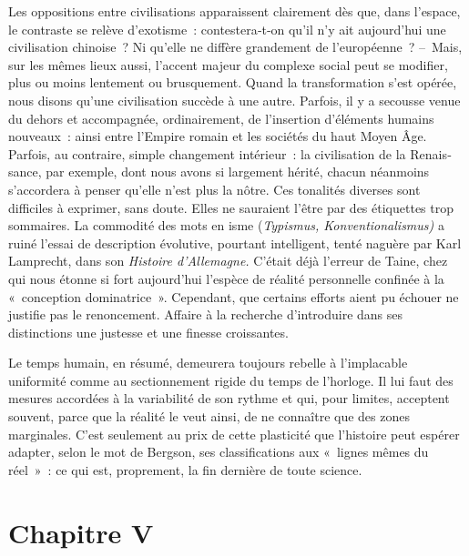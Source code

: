 \documentclass[french,twoside]{book} %
\newcommand{\astermono}{\medskip\centerline{\color{rubric}\large\selectfont{\syms ✻}}\medskip\par}%
\begin{document}
Les oppositions entre civilisations apparaissent clairement dès que, dans l’espace, le contraste se relève d’exotisme : contestera‑t‑on qu’il n’y ait aujourd’hui une civilisation chinoise ? Ni qu’elle ne diffère grandement de l’européenne ? – Mais, sur les mêmes lieux aussi, l’accent majeur du complexe social peut se modifier, plus ou moins lentement ou brusquement. Quand la transformation s’est opérée, nous disons qu’une civilisation succède à une autre. Parfois, il y a secousse venue du dehors et accom­pagnée, ordinairement, de l’insertion d’éléments humains nouveaux : ainsi entre l’Empire romain et les sociétés du haut Moyen Âge. Parfois, au contraire, simple changement intérieur : la civilisation de la Renais­sance, par exemple, dont nous avons si largement hérité, chacun néanmoins s’accordera à penser qu’elle n’est plus la nôtre. Ces tonalités diverses sont difficiles à exprimer, sans doute. Elles ne sauraient l’être par des étiquettes trop sommaires. La commodité des mots en isme (\emph{Typismus, Konven­tionalismus)} a ruiné l’essai de description évolutive, pourtant intelligent, tenté naguère par Karl Lamprecht, dans son \emph{Histoire d’Allemagne.} C’était déjà l’erreur de Taine, chez qui nous étonne si fort aujourd’hui l’espèce de réalité personnelle confinée à la « conception dominatrice ». Cependant, que certains efforts aient pu échouer ne justifie pas le renoncement. Affaire à la recherche d’introduire dans ses distinctions une justesse et une finesse croissantes.\par

\astermono

\noindent Le temps humain, en résumé, demeurera toujours rebelle à l’implacable uniformité comme au sectionnement rigide du temps de l’horloge. Il lui faut des mesures accordées à la variabilité de son rythme et qui, pour limites, acceptent souvent, parce que la réalité le veut ainsi, de ne con­naître que des zones marginales. C’est seulement au prix de cette plasticité que l’histoire peut espérer adapter, selon le mot de Bergson, ses classi­fications aux « lignes mêmes du réel » : ce qui est, proprement, la fin dernière de toute science.
\section[{Chapitre V}]{Chapitre V}\renewcommand{\leftmark}{Chapitre V}
\end{document}
